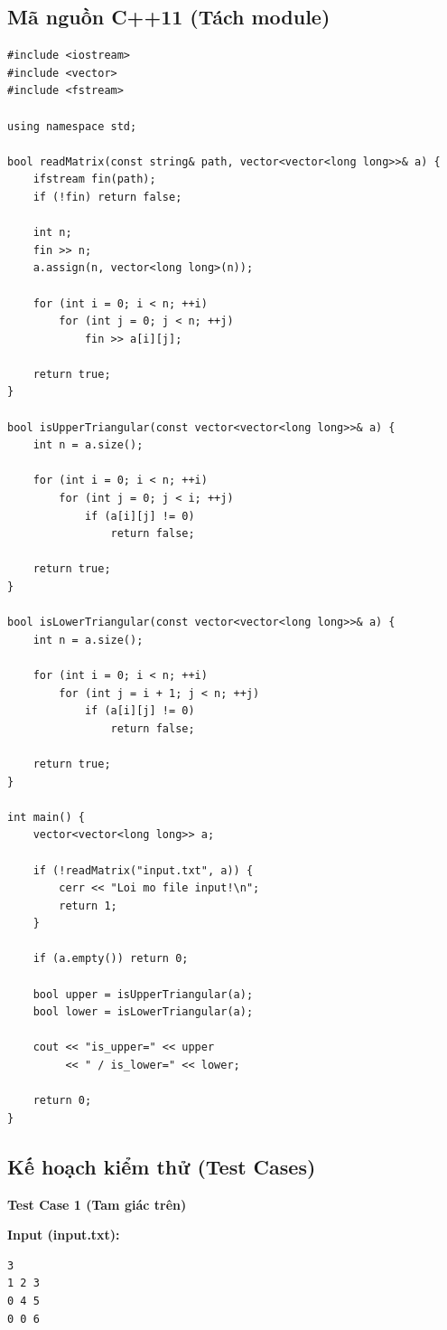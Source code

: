 \subsection{Mã nguồn C++11 (Tách module)}
\begin{lstlisting}
#include <iostream>
#include <vector>
#include <fstream>

using namespace std;

bool readMatrix(const string& path, vector<vector<long long>>& a) {
    ifstream fin(path);
    if (!fin) return false;

    int n;
    fin >> n;
    a.assign(n, vector<long long>(n));

    for (int i = 0; i < n; ++i)
        for (int j = 0; j < n; ++j)
            fin >> a[i][j];

    return true;
}

bool isUpperTriangular(const vector<vector<long long>>& a) {
    int n = a.size();

    for (int i = 0; i < n; ++i)
        for (int j = 0; j < i; ++j)
            if (a[i][j] != 0)
                return false;

    return true;
}

bool isLowerTriangular(const vector<vector<long long>>& a) {
    int n = a.size();

    for (int i = 0; i < n; ++i)
        for (int j = i + 1; j < n; ++j)
            if (a[i][j] != 0)
                return false;

    return true;
}

int main() {
    vector<vector<long long>> a;

    if (!readMatrix("input.txt", a)) {
        cerr << "Loi mo file input!\n";
        return 1;
    }

    if (a.empty()) return 0;

    bool upper = isUpperTriangular(a);
    bool lower = isLowerTriangular(a);

    cout << "is_upper=" << upper
         << " / is_lower=" << lower;

    return 0;
}
\end{lstlisting}

\subsection{Kế hoạch kiểm thử (Test Cases)}

\textbf{Test Case 1 (Tam giác trên)}

\textbf{Input (input.txt):}
\begin{lstlisting}
3
1 2 3
0 4 5
0 0 6
\end{lstlisting}

